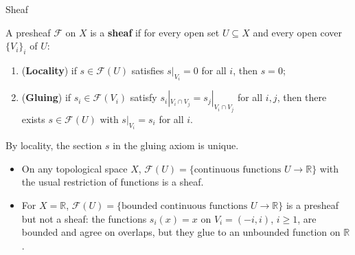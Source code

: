 \documentclass[10pt,aspectratio=1610]{beamer}
\newcommand{\FF}{\mathcal{F}}
\begin{document}
    \begin{frame}{Sheaf}
        \begin{definition}[Sheaf]
            A presheaf $\FF$ on $X$ is a \textbf{sheaf} if for every open set $U \subseteq X$ and every open cover $\{V_i\}_{i}$ of $U$:
            \begin{enumerate}
                \item (\textbf{Locality}) if $s \in \FF(U)$ satisfies $s|_{V_i} = 0$ for all $i$, then $s = 0$;
                \item (\textbf{Gluing}) if $s_i \in \FF(V_i)$ satisfy $s_i|_{V_i \cap V_j} = s_j|_{V_i \cap V_j}$ for all $i, j$, then there exists $s \in \FF(U)$ with $s|_{V_i} = s_i$ for all $i$.
            \end{enumerate}
        \end{definition}
        By locality, the section $s$ in the gluing axiom is unique.
        \begin{example}
            \begin{itemize}
                \item On any topological space $X$, $\FF(U) = \{\text{continuous functions } U \to \mathbb{R}\}$ with the usual restriction of functions is a sheaf.
                \item For $X = \mathbb{R}$, $\FF(U) = \{\text{bounded continuous functions } U \to \mathbb{R}\}$ is a presheaf but not a sheaf: the functions $s_i(x) = x$ on $V_i = (-i, i)$, $i \geq 1$, are bounded and agree on overlaps, but they glue to an unbounded function on $\mathbb{R}$.
            \end{itemize}
        \end{example}
    \end{frame}
\end{document}

